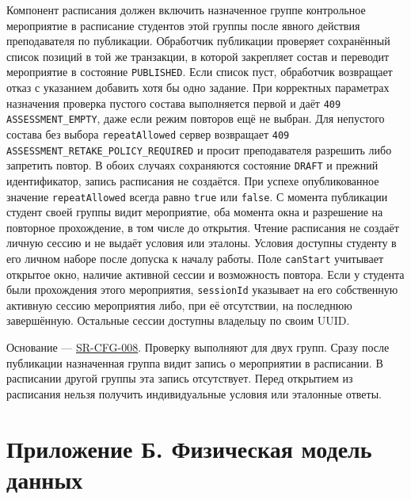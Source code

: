 \documentclass[12pt,a4paper]{article}
\begin{document}
Компонент расписания должен включить назначенное группе контрольное мероприятие в расписание студентов этой группы после явного действия преподавателя по публикации. Обработчик публикации проверяет сохранённый список позиций в той же транзакции, в которой закрепляет состав и переводит мероприятие в состояние \texttt{PUBLISHED}. Если список пуст, обработчик возвращает отказ с указанием добавить хотя бы одно задание. При корректных параметрах назначения проверка пустого состава выполняется первой и даёт \texttt{409 ASSESSMENT\_\allowbreak{}EMPTY}, даже если режим повторов ещё не выбран. Для непустого состава без выбора \texttt{repeat\allowbreak{}Allowed} сервер возвращает \texttt{409 ASSESSMENT\_\allowbreak{}RETAKE\_\allowbreak{}POLICY\_\allowbreak{}REQUIRED} и просит преподавателя разрешить либо запретить повтор. В обоих случаях сохраняются состояние \texttt{DRAFT} и прежний идентификатор, запись расписания не создаётся. При успехе опубликованное значение \texttt{repeat\allowbreak{}Allowed} всегда равно \texttt{true} или \texttt{false}. С момента публикации студент своей группы видит мероприятие, оба момента окна и разрешение на повторное прохождение, в том числе до открытия. Чтение расписания не создаёт личную сессию и не выдаёт условия или эталоны. Условия доступны студенту в его личном наборе после допуска к началу работы. Поле \texttt{canStart} учитывает открытое окно, наличие активной сессии и возможность повтора. Если у студента были прохождения этого мероприятия, \texttt{sessionId} указывает на его собственную активную сессию мероприятия либо, при её отсутствии, на последнюю завершённую. Остальные сессии доступны владельцу по своим UUID.

Основание --- {\href{../04\_Системные\_требования/DOC-05\_Системные\_требования.pdf\#sr-cfg-008}{SR-CFG-008}}. Проверку выполняют для двух групп. Сразу после публикации назначенная группа видит запись о мероприятии в расписании. В расписании другой группы эта запись отсутствует. Перед открытием из расписания нельзя получить индивидуальные условия или эталонные ответы.

\section{Приложение Б. Физическая модель данных}\label{ux43fux440ux438ux43bux43eux436ux435ux43dux438ux435-ux431-ux444ux438ux437ux438ux447ux435ux441ux43aux430ux44f-ux43cux43eux434ux435ux43bux44c-ux434ux430ux43dux43dux44bux445}

\hypertarget{приложение-б-физическая-модель-данных}{}
\end{document}
